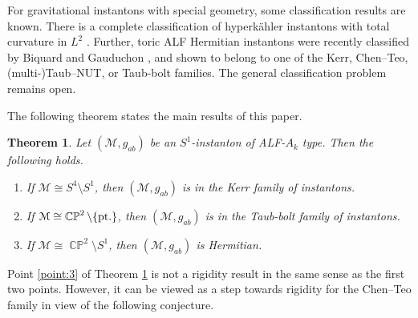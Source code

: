 \documentclass[a4paper,10pt,reqno]{amsart}
\newcommand{\cM}{\mathcal{M}}
\theoremstyle{plain}
\newtheorem{thm}{Theorem}[section]
\DeclareMathOperator{\CP}{\mathbb{C}\mathbb{P}}
\numberwithin{equation}{section}
\begin{document}
For gravitational instantons with special geometry, some  classification results  are known. There is a  complete classification of  hyperk\"ahler instantons with total curvature in $L^2$ \cite{chen2015gravitational,chen2019gravitational,chen2021gravitational,2021arXiv210812991S}. Further, toric ALF Hermitian instantons were recently classified by Biquard and Gauduchon \cite{Biquard:Gauduchon}, and shown to belong to one of the Kerr, Chen--Teo, (multi-)Taub--NUT, or Taub-bolt families. 
The general classification problem remains open. 

The following theorem states the main results of this paper.
\begin{thm}\label{thm:main-intro} Let $(\cM, g_{ab})$ be an $S^1$-instanton of ALF-$A_k$ type. Then the following holds. 
\begin{enumerate} 
\item \label{point:Kerr} 
%
If $\cM \cong S^4 \setminus S^1$, then $(\cM, g_{ab})$ is in the Kerr family of instantons.
\item \label{point:T-b} 
%
If $\cM \cong \CP^2 \setminus \{\text{\rm pt.}\}$, then $(\cM, g_{ab})$ is in the Taub-bolt family of instantons.
\item \label{point:3} 
%
If $\cM \cong \CP^2 \setminus S^1$, then $(\cM, g_{ab})$ is Hermitian. 
\end{enumerate} 
\end{thm} 
Point \ref{point:3} of Theorem \ref{thm:main-intro} is not a rigidity result in the same sense as the first two points. However, it can be viewed as a step towards rigidity for the Chen--Teo family in view of the following conjecture.   
\end{document}
